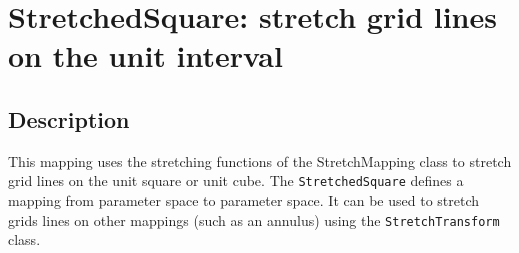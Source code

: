 \section{StretchedSquare: stretch grid lines on the unit interval}

\subsection{Description}

This mapping uses the stretching functions of the {\ff StretchMapping} class
to stretch grid lines on the unit square or unit cube. The {\tt StretchedSquare}
defines a mapping from parameter space to parameter space. It can be 
used to stretch grids lines on other mappings (such as an annulus) using the
{\tt StretchTransform} class.



